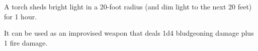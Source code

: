 

A torch sheds bright light in a 20-foot radius (and dim light to the next 20 feet) for 1 hour. 

It can be used as an improvised weapon that deals 1d4 bludgeoning damage plus 1 fire damage.

\vfill

\hfill{}

